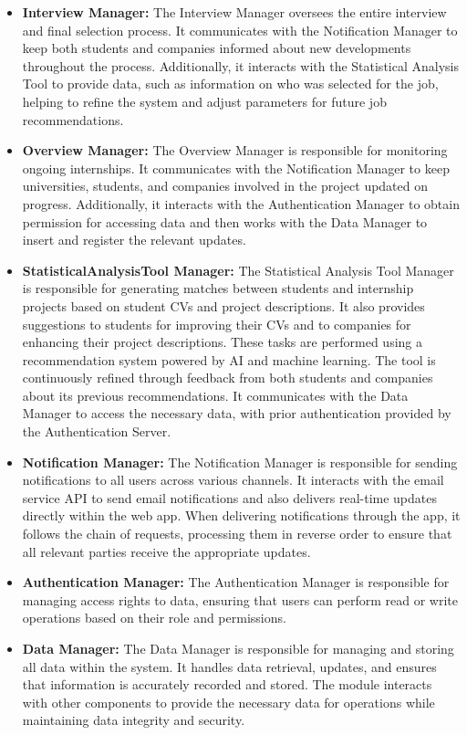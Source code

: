 \begin{itemize}
    \pagebreak
    \item \textbf{Interview Manager:} The Interview Manager oversees the entire interview and final selection process. It communicates with the Notification Manager to keep both students and companies informed about new developments throughout the process. Additionally, it interacts with the Statistical Analysis Tool to provide data, such as information on who was selected for the job, helping to refine the system and adjust parameters for future job recommendations.
    \item \textbf{Overview Manager:} The Overview Manager is responsible for monitoring ongoing internships. It communicates with the Notification Manager to keep universities, students, and companies involved in the project updated on progress. Additionally, it interacts with the Authentication Manager to obtain permission for accessing data and then works with the Data Manager to insert and register the relevant updates.
    \item \textbf{StatisticalAnalysisTool Manager:} The Statistical Analysis Tool Manager is responsible for generating matches between students and internship projects based on student CVs and project descriptions. It also provides suggestions to students for improving their CVs and to companies for enhancing their project descriptions. These tasks are performed using a recommendation system powered by AI and machine learning. The tool is continuously refined through feedback from both students and companies about its previous recommendations. It communicates with the Data Manager to access the necessary data, with prior authentication provided by the Authentication Server.
    \item \textbf{Notification Manager:} The Notification Manager is responsible for sending notifications to all users across various channels. It interacts with the email service API to send email notifications and also delivers real-time updates directly within the web app. When delivering notifications through the app, it follows the chain of requests, processing them in reverse order to ensure that all relevant parties receive the appropriate updates.
    \item \textbf{Authentication Manager:} The Authentication Manager is responsible for managing access rights to data, ensuring that users can perform read or write operations based on their role and permissions.
    \item \textbf{Data Manager:} The Data Manager is responsible for managing and storing all data within the system. It handles data retrieval, updates, and ensures that information is accurately recorded and stored. The module interacts with other components to provide the necessary data for operations while maintaining data integrity and security.

\end{itemize}
